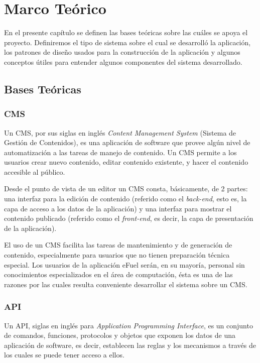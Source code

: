 \chapter{Marco Teórico}
En el presente capítulo se definen las bases teóricas sobre las cuáles se apoya el proyecto. Definiremos el tipo de sistema sobre el cual se desarrolló la aplicación, los patrones de diseño usados para la construcción de la aplicación y algunos conceptos útiles para entender algunos componentes del sistema desarrollado.

\section{Bases Teóricas}

\subsection{CMS}
Un CMS, por sus siglas en inglés \textit{Content Management System} (Sistema de Gestión de Contenidos), es una aplicación de software que provee algún nivel de automatización a las tareas de manejo de contenido. Un CMS permite a los usuarios crear nuevo contenido, editar contenido existente, y hacer el contenido accesible al público. \cite{cmsBarker}

Desde el punto de vista de un editor un CMS consta, básicamente, de 2 partes: una interfaz para la edición de contenido (referido como el \textit{back-end}, esto es, la capa de acceso a los datos de la aplicación) y una interfaz para mostrar el contenido publicado (referido como el \textit{front-end}, es decir, la capa de presentación de la aplicación).

El uso de un CMS facilita las tareas de mantenimiento y de generación de contenido, especialmente para usuarios que no tienen preparación técnica especial. Los usuarios de la aplicación eFuel serán, en su mayoría, personal sin conocimientos especializados en el área de computación, ésta es una de las razones por las cuales resulta conveniente desarrollar el sistema sobre un CMS.

\subsection{API}
Un API, siglas en inglés para \textit{Application Programming Interface}, es un conjunto de comandos, funciones, protocolos y objetos que exponen los datos de una aplicación de software, es decir, establecen las reglas y los mecanismos a través de los cuales se puede tener acceso a ellos. \cite{apiChristensson}

